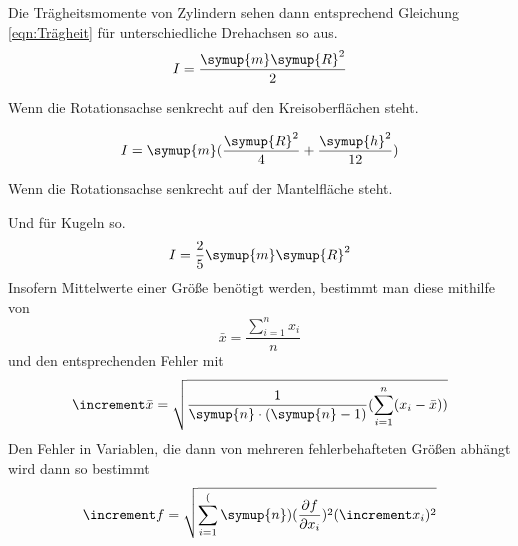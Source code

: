 Die Trägheitsmomente von Zylindern sehen dann entsprechend Gleichung \ref{eqn:Trägheit} für unterschiedliche
Drehachsen so aus.
\begin{equation}
    I=\frac{\symup{m}\symup{R}^2}{2} 
    \label{eqn:Trägheit_Zyl_1} 
\end{equation}
    \begin{center} 
    Wenn die Rotationsachse senkrecht auf den Kreisoberflächen steht.
    \end{center}
\begin{equation}
    I=\symup{m} (\frac{\symup{R}^2}{4}+\frac{\symup{h}^2}{12}) 
    \label{eqn:Trägheit_Zyl_2}  
\end{equation}
\begin{center}   
    Wenn die Rotationsachse senkrecht auf der Mantelfläche steht.
\end{center}

Und für Kugeln so.
\begin{equation}
    I=\frac{2}{5}\symup{m}\symup{R}^2
    \label{eqn:Trägheit_Kugel}
\end{equation}
Insofern Mittelwerte einer Größe benötigt werden, bestimmt man diese mithilfe von
\begin{equation}
    \bar{x}=\frac{\sum_{i=1}^n x_i}{n}
\end{equation}
und den entsprechenden Fehler mit
\begin{equation}
    \increment\bar{x}=\sqrt{\frac{1}{\symup{n}\cdot(\symup{n}-1)}(\sum_{i=1}^n (x_i - \bar{x}))}
\end{equation}
Den Fehler in Variablen, die dann von mehreren fehlerbehafteten Größen abhängt wird dann so bestimmt
\begin{equation}
    \increment f=\sqrt{\sum_{i=1}^(\symup{n}) (\frac{\partial f}{\partial x_i})^2 (\increment x_i)^2}
\end{equation}
\cite{sample}
